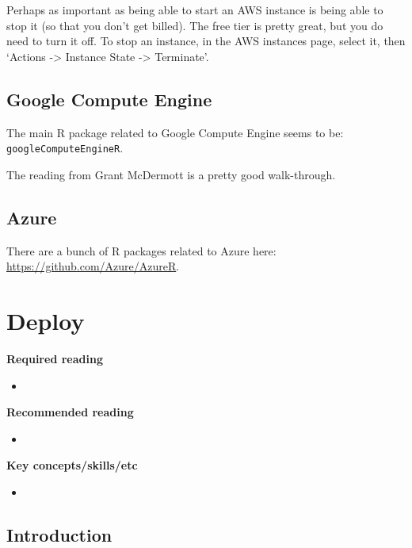 \documentclass[
]{book}
\begin{document}
Perhaps as important as being able to start an AWS instance is being able to stop it (so that you don't get billed). The free tier is pretty great, but you do need to turn it off. To stop an instance, in the AWS instances page, select it, then `Actions -\textgreater{} Instance State -\textgreater{} Terminate'.

\hypertarget{google-compute-engine}{%
\section{Google Compute Engine}\label{google-compute-engine}}

The main R package related to Google Compute Engine seems to be: \texttt{googleComputeEngineR}.

The reading from Grant McDermott is a pretty good walk-through.

\hypertarget{azure}{%
\section{Azure}\label{azure}}

There are a bunch of R packages related to Azure here: \url{https://github.com/Azure/AzureR}.

\hypertarget{deploy}{%
\chapter{Deploy}\label{deploy}}

\textbf{Required reading}

\begin{itemize}
\item
\end{itemize}

\textbf{Recommended reading}

\begin{itemize}
\item
\end{itemize}

\textbf{Key concepts/skills/etc}

\begin{itemize}
\item
\end{itemize}

\hypertarget{introduction-28}{%
\section{Introduction}\label{introduction-28}}
\end{document}
